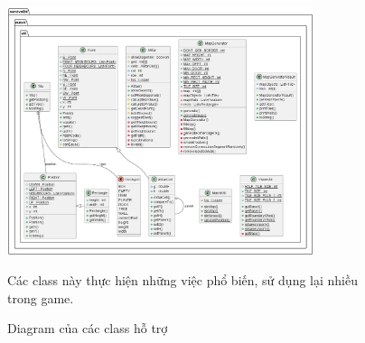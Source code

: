 \documentclass[12pt,a4paper]{article}
\begin{document}
  \begin{figure}
    \centering
    \includegraphics[width=0.8\textwidth]{Img/uml/util.png}
    \caption{Diagram của các class hỗ trợ}
    Các class này thực hiện những việc phổ biến, sử dụng lại nhiều trong game.
  \end{figure}
\end{document}
